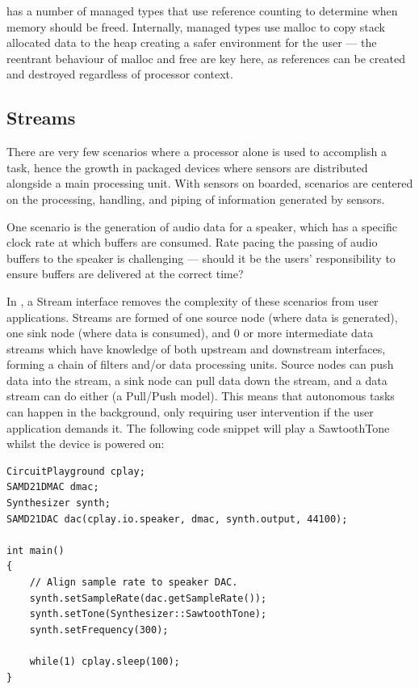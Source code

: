 \CO has a number of managed types that use reference counting to determine when memory should be freed. Internally, managed types use malloc to copy stack allocated data to the heap creating a safer environment for the user --- the reentrant behaviour of malloc and free are key here, as references can be created and destroyed regardless of processor context.

\subsection{Streams}
There are very few scenarios where a processor alone is used to accomplish a task, hence the growth in packaged devices where sensors are distributed alongside a main processing unit. With sensors on boarded, scenarios are centered on the processing, handling, and piping of information generated by sensors.

One scenario is the generation of audio data for a speaker, which has a specific clock rate at which buffers are consumed. Rate pacing the passing of audio buffers to the speaker is challenging --- should it be the users' responsibility to ensure buffers are delivered at the correct time?

In \CO, a Stream interface removes the complexity of these scenarios from user applications. Streams are formed of one source node (where data is generated), one sink node (where data is consumed), and 0 or more intermediate data streams which have knowledge of both upstream and downstream interfaces, forming a chain of filters and/or data processing units. Source nodes can push data into the stream, a sink node can pull data down the stream, and a data stream can do either (a Pull/Push model). This means that autonomous tasks can happen in the background, only requiring user intervention if the user application demands it.
The following code snippet will play a SawtoothTone whilst the device is powered on:
\begin{lstlisting}
CircuitPlayground cplay;
SAMD21DMAC dmac;
Synthesizer synth;
SAMD21DAC dac(cplay.io.speaker, dmac, synth.output, 44100);

int main()
{
    // Align sample rate to speaker DAC.
    synth.setSampleRate(dac.getSampleRate());
    synth.setTone(Synthesizer::SawtoothTone);
    synth.setFrequency(300);

    while(1) cplay.sleep(100);
}
\end{lstlisting}
